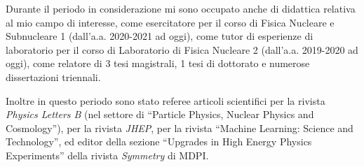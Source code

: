 \documentclass[a4paper,12pt,twoside]{article}
\begin{document}
{  Durante il periodo in considerazione mi sono occupato anche di
  didattica relativa al mio campo di interesse, come esercitatore per
  il corso di Fisica Nucleare e Subnucleare 1 (dall'a.a. 2020-2021 ad
  oggi), come tutor di esperienze di laboratorio per il corso di
  Laboratorio di Fisica Nucleare 2 (dall'a.a. 2019-2020 ad oggi), come
  relatore di 3 tesi magistrali, 1 tesi di dottorato e numerose
  dissertazioni triennali.

  Inoltre in questo periodo sono stato referee articoli scientifici
  per la rivista \textit{Physics Letters B} (nel settore di
  ``Particle Physics, Nuclear Physics and Cosmology''), per la rivista
  \textit{JHEP}, per la rivista ``Machine Learning: Science and
  Technology'', ed editor della sezione ``Upgrades in High Energy
  Physics Experiments'' della rivista \textit{Symmetry} di MDPI.
  
}


\citeall{*}
\end{document}
